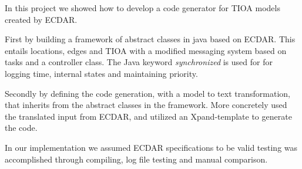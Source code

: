 In this project we showed how to develop a code generator for TIOA 
models created by ECDAR. 

First by building a framework of abstract classes in java based on 
ECDAR. This entails locations, edges and TIOA with a modified messaging 
system based on tasks and a controller class. The Java keyword 
\textit{synchronized} is used for for logging time, internal states and 
maintaining priority. 

Secondly by defining the code generation, with a model to text 
transformation, that inherits from the abstract classes in the 
framework. More concretely used the translated input from ECDAR, and 
utilized an Xpand-template to generate the code. 

In our implementation we assumed ECDAR specifications to be valid 
testing was accomplished through compiling, log file testing and manual 
comparison. 
